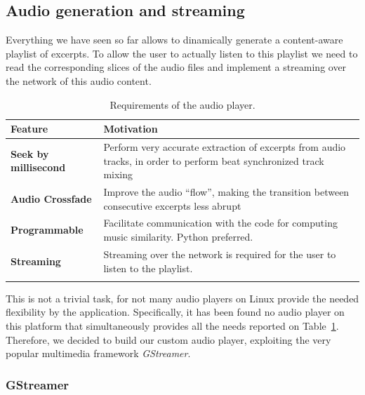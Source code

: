 \subsection{Audio generation and streaming}
\label{sec:audio}
Everything we have seen so far allows to dinamically generate a content-aware playlist of excerpts. To allow the user to actually listen to this playlist we need to read the corresponding slices of the audio files and implement a streaming over the network of this audio content. \\ 
\begin{center}
\begin{longtable}{ p{}  p{} } 
\textbf{Feature} & \textbf{Motivation} \\
\toprule
\textbf{Seek by millisecond}   & Perform very accurate extraction of excerpts from audio tracks, in order to perform beat synchronized track mixing \\ \midrule
\textbf{Audio Crossfade}   & Improve the audio ``flow'', making the transition between consecutive excerpts less abrupt \\ \midrule
\textbf{Programmable} & Facilitate communication with the code for computing music similarity. Python preferred.  \\ \midrule
\textbf{Streaming} & Streaming over the network is required for the user to listen to the playlist.  \\ \bottomrule
\caption[Requirements of the audio player]{Requirements of the audio player.}
\label{table:playerfeatures}
\end{longtable}
\end{center}
This is not a trivial task, for not many audio players on Linux provide the needed flexibility by the application. Specifically, it has been found no audio player on this platform that simultaneously provides all the needs reported on Table~\ref{table:playerfeatures}. Therefore, we decided to build our custom audio player, exploiting the very popular multimedia framework \textit{GStreamer}.



\subsubsection*{GStreamer}
\label{subsec:gstreamer}

